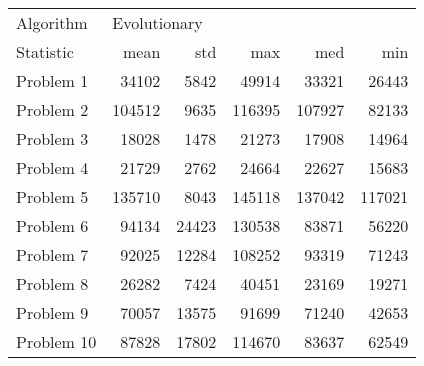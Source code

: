 \begin{tabular}{lrrrrr}
\toprule
Algorithm & \multicolumn{5}{l}{Evolutionary} \\
Statistic &         mean &    std &     max &     med &     min \\
\midrule
Problem 1  &        34102 &   5842 &   49914 &   33321 &   26443 \\
Problem 2  &       104512 &   9635 &  116395 &  107927 &   82133 \\
Problem 3  &        18028 &   1478 &   21273 &   17908 &   14964 \\
Problem 4  &        21729 &   2762 &   24664 &   22627 &   15683 \\
Problem 5  &       135710 &   8043 &  145118 &  137042 &  117021 \\
Problem 6  &        94134 &  24423 &  130538 &   83871 &   56220 \\
Problem 7  &        92025 &  12284 &  108252 &   93319 &   71243 \\
Problem 8  &        26282 &   7424 &   40451 &   23169 &   19271 \\
Problem 9  &        70057 &  13575 &   91699 &   71240 &   42653 \\
Problem 10 &        87828 &  17802 &  114670 &   83637 &   62549 \\
\bottomrule
\end{tabular}
